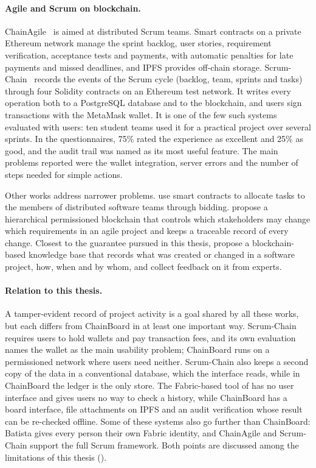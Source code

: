\paragraph{Agile and Scrum on blockchain.} ChainAgile~\cite{qureshi2024chainagile} is aimed at distributed Scrum teams. Smart contracts on a private Ethereum network manage the sprint backlog, user stories, requirement verification, acceptance tests and payments, with automatic penalties for late payments and missed deadlines, and IPFS provides off-chain storage. Scrum-Chain~\cite{silva_scrumchain} records the events of the Scrum cycle (backlog, team, sprints and tasks) through four Solidity contracts on an Ethereum test network. It writes every operation both to a PostgreSQL database and to the blockchain, and users sign transactions with the MetaMask wallet. It is one of the few such systems evaluated with users: ten student teams used it for a practical project over several sprints. In the questionnaires, 75\% rated the experience as excellent and 25\% as good, and the audit trail was named as its most useful feature. The main problems reported were the wallet integration, server errors and the number of steps needed for simple actions.

Other works address narrower problems. \textcite{gupta2021allocation} use smart contracts to allocate tasks to the members of distributed software teams through bidding. \textcite{rocky2021requirements} propose a hierarchical permissioned blockchain that controls which stakeholders may change which requirements in an agile project and keeps a traceable record of every change. Closest to the guarantee pursued in this thesis, \textcite{demi2024traceability} propose a blockchain-based knowledge base that records what was created or changed in a software project, how, when and by whom, and collect feedback on it from experts.

\paragraph{Relation to this thesis.} A tamper-evident record of project activity is a goal shared by all these works, but each differs from ChainBoard in at least one important way. Scrum-Chain requires users to hold wallets and pay transaction fees, and its own evaluation names the wallet as the main usability problem; ChainBoard runs on a permissioned network where users need neither. Scrum-Chain also keeps a second copy of the data in a conventional database, which the interface reads, while in ChainBoard the ledger is the only store. The Fabric-based tool of \textcite{batista2021} has no user interface and gives users no way to check a history, while ChainBoard has a board interface, file attachments on IPFS and an audit verification whose result can be re-checked offline. Some of these systems also go further than ChainBoard: Batista gives every person their own Fabric identity, and ChainAgile and Scrum-Chain support the full Scrum framework. Both points are discussed among the limitations of this thesis ().


